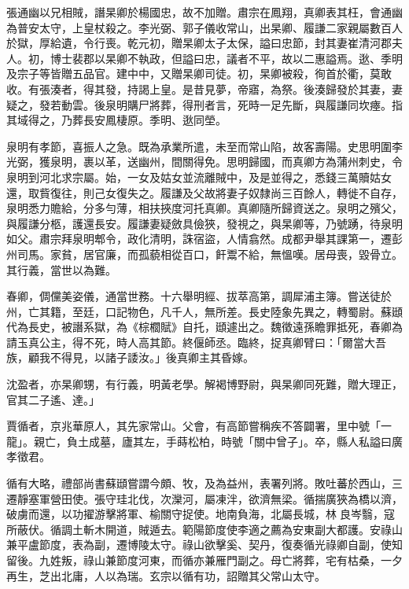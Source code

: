 \begin{pinyinscope}
 張通幽以兄相賊，譖杲卿於楊國忠，故不加贈。肅宗在鳳翔，真卿表其枉，會通幽為普安太守，上皇杖殺之。李光弼、郭子儀收常山，出杲卿、履謙二家親屬數百人於獄，厚給遺，令行喪。乾元初，贈杲卿太子太保，謚曰忠節，封其妻崔清河郡夫人。初，博士裴郡以杲卿不執政，但謚曰忠，議者不平，故以二惠謚焉。逖、季明及宗子等皆贈五品官。建中中，又贈杲卿司徒。初，杲卿被殺，徇首於衢，莫敢收。有張湊者，得其發，持謁上皇。是昔見夢，帝寤，為祭。後湊歸發於其妻，妻疑之，發若動雲。後泉明購尸將葬，得刑者言，死時一足先斷，與履謙同坎瘞。指其域得之，乃葬長安鳳棲原。季明、逖同塋。



 泉明有孝節，喜振人之急。既為承業所遣，未至而常山陷，故客壽陽。史思明圍李光弼，獲泉明，裹以革，送幽州，間關得免。思明歸國，而真卿方為蒲州刺史，令泉明到河北求宗屬。始，一女及姑女並流離賊中，及是並得之，悉錢三萬贖姑女還，取貲復往，則己女復失之。履謙及父故將妻子奴隸尚三百餘人，轉徙不自存，泉明悉力贍給，分多勻薄，相扶挾度河托真卿。真卿隨所歸資送之。泉明之殯父，與履謙分柩，護還長安。履謙妻疑斂具儉狹，發視之，與杲卿等，乃號踴，待泉明如父。肅宗拜泉明郫令，政化清明，誅宿盜，人情翕然。成都尹舉其課第一，遷彭州司馬。家貧，居官廉，而孤藐相從百口，飦鬻不給，無慍嘆。居母喪，毀骨立。其行義，當世以為難。



 春卿，倜儻美姿儀，通當世務。十六舉明經、拔萃高第，調犀浦主簿。嘗送徒於州，亡其籍，至廷，口記物色，凡千人，無所差。長史陸象先異之，轉蜀尉。蘇頲代為長史，被譖系獄，為《棕櫚賦》自托，頲遽出之。魏徵遠孫瞻罪抵死，春卿為請玉真公主，得不死，時人高其節。終偃師丞。臨終，捉真卿臂曰：「爾當大吾族，顧我不得見，以諸子諉汝。」後真卿主其昏嫁。



 沈盈者，亦杲卿甥，有行義，明黃老學。解褐博野尉，與杲卿同死難，贈大理正，官其二子遙、達。」



 賈循者，京兆華原人，其先家常山。父會，有高節嘗稱疾不答闢署，里中號「一龍」。親亡，負土成墓，廬其左，手蒔松柏，時號「關中曾子」。卒，縣人私謚曰廣孝徵君。



 循有大略，禮部尚書蘇頲嘗謂今頗、牧，及為益州，表署列將。敗吐蕃於西山，三遷靜塞軍營田使。張守珪北伐，次灤河，屬凍泮，欲濟無梁。循揣廣狹為橋以濟，破虜而還，以功擢游擊將軍、榆關守捉使。地南負海，北屬長城，林良岑翳，寇所蔽伏。循調土斬木開道，賊遁去。範陽節度使李適之薦為安東副大都護。安祿山兼平盧節度，表為副，遷博陵太守。祿山欲擊奚、契丹，復奏循光祿卿自副，使知留後。九姓叛，祿山兼節度河東，而循亦兼雁門副之。母亡將葬，宅有枯桑，一夕再生，芝出北庸，人以為瑞。玄宗以循有功，詔贈其父常山太守。




\end{pinyinscope}
